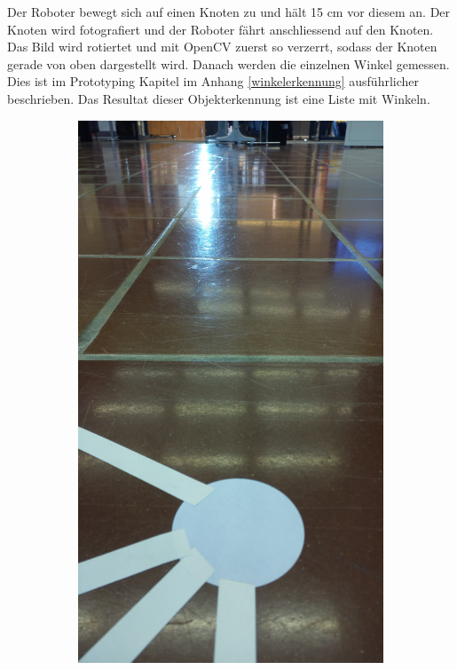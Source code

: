 Der Roboter bewegt sich auf einen Knoten zu und hält 15 cm vor diesem an. Der Knoten wird fotografiert und der Roboter fährt anschliessend auf den Knoten. Das Bild wird rotiertet und mit OpenCV zuerst so verzerrt, sodass der Knoten gerade von oben dargestellt wird. Danach werden die einzelnen Winkel gemessen. Dies ist im Prototyping Kapitel im Anhang \ref{winkelerkennung} ausführlicher beschrieben. Das Resultat dieser Objekterkennung ist eine Liste mit Winkeln.

\begin{figure}[H]
\begin{subfigure}{0.45\textwidth}
\centering
\includegraphics[width=0.95\linewidth]{assets/informatik-prototyp/opencv/angle_detection/image_taken_by_pi_camer_before_node.jpg} 

\end{subfigure}
\end{figure}
